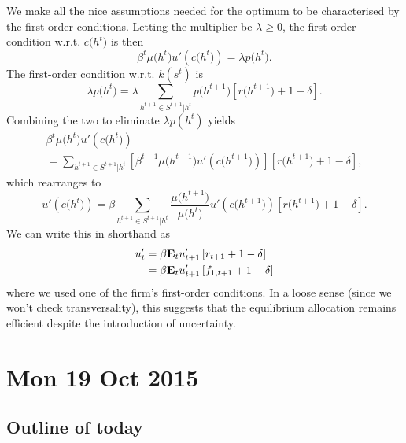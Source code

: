 \documentclass[11pt,letterpaper,reqno,oneside]{article}
\begin{document}
We make all the nice assumptions needed for the optimum to be characterised by the first-order conditions. Letting the multiplier be $\lambda \geq 0$, the first-order condition w.r.t. $c\bigl(h^t\bigr)$ is then
%
\begin{equation*}
	\beta^t \mu\bigl(h^t\bigr) u'\left(c\bigl(h^t\bigr)\right) = \lambda p\bigl(h^t\bigr) .
\end{equation*}
%
The first-order condition w.r.t. $k(s^t)$ is
%
\begin{equation*}
	\lambda p\bigl(h^t\bigr) 
	= \lambda \sum_{h^{t+1} \in S^{t+1}|h^t} 
	p\bigl(h^{t+1}\bigr) \left[ r\bigl(h^{t+1}\bigr) + 1-\delta \right] .
\end{equation*}
%
Combining the two to eliminate $\lambda p(h^t)$ yields
%
\begin{multline*}
	\beta^t \mu\bigl(h^t\bigr) u'\left(c\bigl(h^t\bigr)\right) 
	\\
	= \sum_{h^{t+1} \in S^{t+1}|h^t} 
	\left[ \beta^{t+1} \mu\bigl(h^{t+1}\bigr) u'\left(c\bigl(h^{t+1}\bigr)\right) \right] 
	\left[ r\bigl(h^{t+1}\bigr) + 1-\delta \right] ,
\end{multline*}
%
which rearranges to
%
\begin{equation*}
	u'\left(c\bigl(h^t\bigr)\right) 
	= \beta \sum_{h^{t+1} \in S^{t+1}|h^t} 
	\frac{ \mu\bigl(h^{t+1}\bigr) }{ \mu\bigl(h^t\bigr) }
	u'\left(c\bigl(h^{t+1}\bigr)\right)  
	\left[ r\bigl(h^{t+1}\bigr) + 1-\delta \right] .
\end{equation*}
%
We can write this in shorthand as
%
\begin{align*}
	u'_t 
	&= \beta \mathbf{E}_t u'_{t+1} \left[ r_{t+1} + 1 - \delta \right] 
	\\
	&= \beta \mathbf{E}_t u'_{t+1} \left[ f_{1,t+1} + 1 - \delta \right] 
\end{align*}
%
where we used one of the firm's first-order conditions. In a loose sense (since we won't check transversality), this suggests that the equilibrium allocation remains efficient despite the introduction of uncertainty.



\pagebreak
\section{Mon 19 Oct 2015}
\label{sec:19Oct2015}


\subsection{Outline of today}
\label{sec:19Oct2015:outline_of_today}
\end{document}
